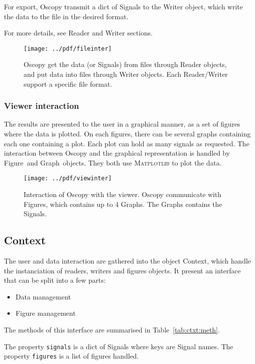 \documentclass[a4paper,11pt]{article}
\newcommand{\cls}[1]{\textsf{#1}}
\newcommand{\prop}[1]{\texttt{#1}}
\newcommand{\ctx}{\cls{Context}}
\newcommand{\sig}{\cls{Signal}}
\newcommand{\module}[1]{\textsc{#1}}
\newcommand{\graph}{\cls{Graph}}
\newcommand{\fig}{\cls{Figure}}
\begin{document}
For export, Oscopy transmit a dict of \sig s to the Writer object, which write the data to the file in the desired format.

For more details, see Reader and Writer sections.

\begin{figure}[htbp]
  \centering
  \texttt{[image: ../pdf/fileinter]}
  \caption{Oscopy get the data (or \sig s) from files through Reader objects, and put data into files through Writer objects. Each Reader/Writer support a specific file format.}
  \label{fig:fileinter}
\end{figure}

\subsubsection{Viewer interaction}
\label{sec:viewinter}
The results are presented to the user in a graphical manner, as a set of figures where the data is plotted.
On each figures, there can be several graphs containing each one containing a plot.
Each plot can hold as many signals as requested.
The interaction between Oscopy and the graphical representation is handled by \fig\ and \graph\ objects.
They both use \module{Matplotlib} to plot the data.

\begin{figure}[htbp]
  \centering
  \texttt{[image: ../pdf/viewinter]}
  \caption{Interaction  of Oscopy with the viewer. Oscopy communicate with Figures, which contains up to 4 Graphs. The Graphs contains the \sig s.}
  \label{fig:viewinter}
\end{figure}

\subsection{Context}
The user and data interaction are gathered into the object \ctx, which handle the instanciation of readers, writers and figures objects.
It present an interface that can be split into a few parts:
\begin{itemize}
\item Data management
\item Figure management
\end{itemize}
The methods of this interface are summarised in Table~\ref{tab:ctxt:meth}.

The property \prop{signals} is a dict of \cls{Signals} where keys are Signal names.
The property \prop{figures} is a list of figures handled.
\end{document}

